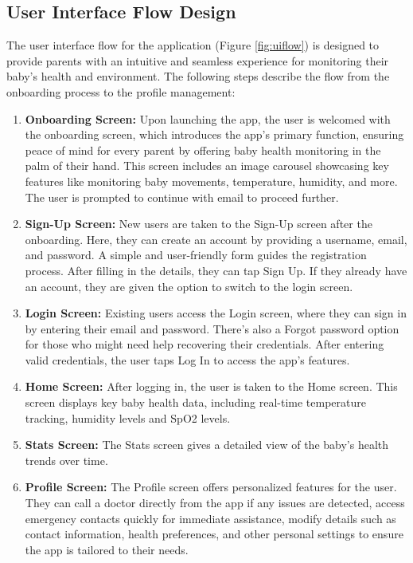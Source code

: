 \documentclass[12pt,a4paper]{report}
\begin{document}
\subsection{User Interface Flow Design}
The user interface flow for the application (Figure \ref{fig:uiflow}) is designed to provide parents with an intuitive and seamless experience for monitoring their baby's health and environment. The following steps describe the flow from the onboarding process to the profile management:
\begin{enumerate}
  \item \textbf{Onboarding Screen:} Upon launching the app, the user is welcomed with the onboarding screen, which introduces the app’s primary function, ensuring peace of mind for every parent by offering baby health monitoring in the palm of their hand. This screen includes an image carousel showcasing key features like monitoring baby movements, temperature, humidity, and more. The user is prompted to continue with email to proceed further.
  \item \textbf{Sign-Up Screen:} New users are taken to the Sign-Up screen after the onboarding. Here, they can create an account by providing a username, email, and password. A simple and user-friendly form guides the registration process. After filling in the details, they can tap Sign Up. If they already have an account, they are given the option to switch to the login screen.
  \item \textbf{Login Screen:} Existing users access the Login screen, where they can sign in by entering their email and password. There’s also a Forgot password option for those who might need help recovering their credentials. After entering valid credentials, the user taps Log In to access the app’s features.
  \item \textbf{Home Screen:} After logging in, the user is taken to the Home screen. This screen displays key baby health data, including real-time temperature tracking, humidity levels and SpO2 levels.
  \item \textbf{Stats Screen:} The Stats screen gives a detailed view of the baby’s health trends over time. 
  \item \textbf{Profile Screen:} The Profile screen offers personalized features for the user. They can call a doctor directly from the app if any issues are detected, access emergency contacts quickly for immediate assistance, modify details such as contact information, health preferences, and other personal settings to ensure the app is tailored to their needs.
\end{enumerate}
\end{document}
